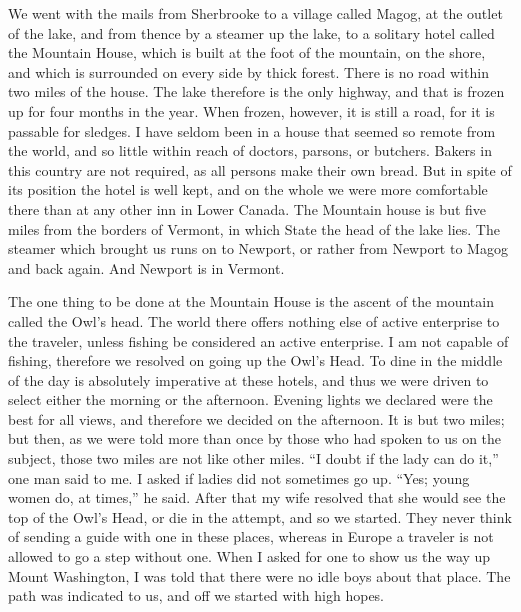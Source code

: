 We went with the mails from Sherbrooke to a village called Magog,
at the outlet of the lake, and from thence by a steamer up the
lake, to a solitary hotel called the Mountain House, which is built
at the foot of the mountain, on the shore, and which is surrounded
on every side by thick forest.  There is no road within two miles
of the house.  The lake therefore is the only highway, and that is
frozen up for four months in the year.  When frozen, however, it is
still a road, for it is passable for sledges.  I have seldom been
in a house that seemed so remote from the world, and so little
within reach of doctors, parsons, or butchers.  Bakers in this
country are not required, as all persons make their own bread.  But
in spite of its position the hotel is well kept, and on the whole
we were more comfortable there than at any other inn in Lower
Canada.  The Mountain house is but five miles from the borders of
Vermont, in which State the head of the lake lies.  The steamer
which brought us runs on to Newport, or rather from Newport to
Magog and back again.  And Newport is in Vermont.

The one thing to be done at the Mountain House is the ascent of the
mountain called the Owl's head.  The world there offers nothing
else of active enterprise to the traveler, unless fishing be
considered an active enterprise.  I am not capable of fishing,
therefore we resolved on going up the Owl's Head.  To dine in the
middle of the day is absolutely imperative at these hotels, and
thus we were driven to select either the morning or the afternoon.
Evening lights we declared were the best for all views, and
therefore we decided on the afternoon.  It is but two miles; but
then, as we were told more than once by those who had spoken to us
on the subject, those two miles are not like other miles.  ``I doubt
if the lady can do it,'' one man said to me.  I asked if ladies did
not sometimes go up.  ``Yes; young women do, at times,'' he said.
After that my wife resolved that she would see the top of the Owl's
Head, or die in the attempt, and so we started.  They never think
of sending a guide with one in these places, whereas in Europe a
traveler is not allowed to go a step without one.  When I asked for
one to show us the way up Mount Washington, I was told that there
were no idle boys about that place.  The path was indicated to us,
and off we started with high hopes.

